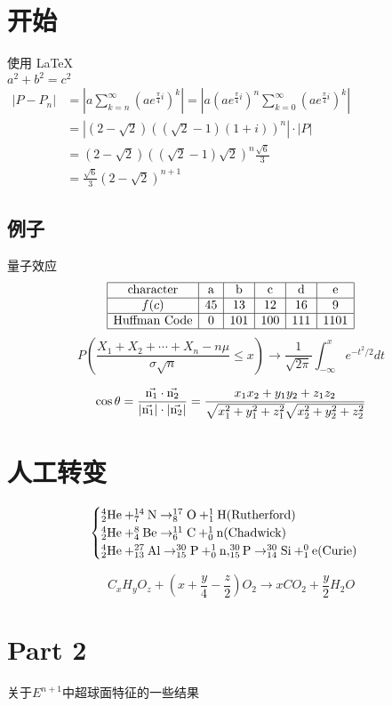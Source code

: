 \documentclass[UTF8]{article}
\begin{document}
       
 
\section{开始}   
使用       
\LaTeX \,\\ 
 $a^2+b^2=c^2$\\
 $\begin{aligned}
    \left|P-P_{n}\right|&=\left|a \sum_{k=n}^{\infty}\left(a e^{\frac{\pi}{4} i}\right)^{k}\right|=\left|a\left(a e^{\frac{\pi}{4} i}\right)^{n} \sum_{k=0}^{\infty}\left(a e^{\frac{\pi}{4} i}\right)^{k}\right|\\&=\left|(2-\sqrt{2})((\sqrt{2}-1)(1+i))^{n}\right| \cdot|P|\\&=(2-\sqrt{2})((\sqrt{2}-1) \sqrt{2})^{n} \frac{\sqrt{6}}{3}\\&=\frac{\sqrt{6}}{3}(2-\sqrt{2})^{n+1}\end{aligned}$

\subsection{例子}  

量子效应\cite{Can}
\\
$$\begin{array}{|c|c|c|c|c|c|}
    \hline
    \text{character}&\text{a}&\text{b}&\text{c}&\text{d}&\text{e}\\
    \hline
    f(c)&45&13&12&16&9\\
    \hline
    \text{Huffman Code}&0&101&100&111&1101\\
    \hline
    \end{array}$$
$$P\left(\frac{X_{1}+X_{2}+\cdots+X_{n}-n \mu}{\sigma \sqrt{n}} \leq x\right)\to \frac{1}{\sqrt{2 \pi}} \int_{-\infty}^{x} e^{-t^{2} / 2} d t$$



$$
\cos\theta=\frac{\vec{\rm{n_1}}\cdot\vec{\rm{n_2}}  }{|\vec{\rm{n_1}}|\cdot|\vec{\rm{n_2}}|}=\frac{x_{1} x_{2}+y_{1} y_{2}+z_{1} z_{2}}{\sqrt{x_{1}^{2}+y_{1}^{2}+z_{1}^{2}} \sqrt{x_{2}^{2}+y_{2}^{2}+z_{2}^{2}}}
$$
\section{人工转变}

$$
\begin{cases}\rm
    _{2}^{4}He+ _{7}^{14}N \rightarrow _{8}^{17}O + _{1}^{1}H(Rutherford)\\\rm
    _{2}^{4}He+ _{4}^{8}Be \rightarrow _{6}^{11}C + _{0}^{1}n(Chadwick)\\\rm
    _{2}^{4}He+ _{13}^{27}Al \rightarrow _{15}^{30}P + _{0}^{1}n,_{15}^{30}P \rightarrow _{14}^{30}Si + _{1}^{0}e(Curie)
    \end{cases}
$$

$$
{C_xH_yO_z +(x +\frac y4-\frac z2)O_2\rightarrow xCO_2+\frac y2H_2O}
$$

\section{Part 2}
关于$E^{n+1}$中超球面特征的一些结果\cite{闻家君}



\end{document}
